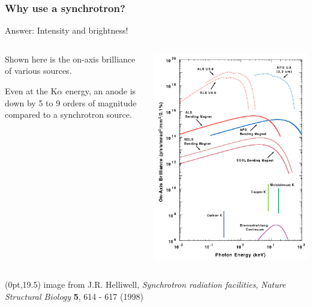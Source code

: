 \documentclass[10pt, xcolor=x11names, compress]{beamer}
\begin{document}
\begin{frame}
  \frametitle{Why use a synchrotron?}

  \begin{center}
    \alert{Answer:} Intensity and brightness!
  \end{center}
  \begin{columns}
    \begin{column}{0.5\linewidth}
      Shown here is the on-axis brilliance of various sources.

      Even at the K$\alpha$ energy, an anode is down by 5 to 9 orders
      of magnitude compared to a synchrotron source.
    \end{column}
    \begin{column}{0.5\linewidth}
      \includegraphics[width=\linewidth]{pses/nsb0898_616.png}
    \end{column}
  \end{columns}
  \begin{textblock*}{0.5\linewidth}(0pt,19.5\TPVertModule) 
    \tiny
    image from J.R. Helliwell, \textit{Synchrotron radiation facilities},
    \textit{Nature Structural Biology}  \textbf{5}, 614 - 617 (1998)
  \end{textblock*}
\end{frame}
\end{document}
